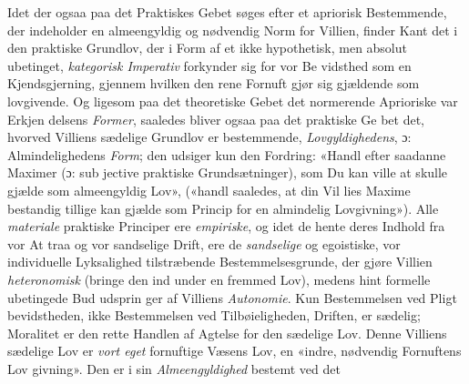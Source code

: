 \documentclass[12pt,a4paper]{book}
\begin{document}
Idet der ogsaa paa det Praktiskes Gebet søges efter et
apriorisk Bestemmende, der indeholder en almeengyldig og
nødvendig Norm for Villien, finder Kant det i den praktiske
Grundlov, der i Form af et ikke hypothetisk, men absolut
ubetinget, \emph{kategorisk Imperativ} forkynder sig for vor Be\-%
vidsthed som en Kjendsgjerning, gjennem hvilken den rene
Fornuft gjør sig gjældende som lovgivende. Og ligesom paa
det theoretiske Gebet det normerende Aprioriske var Erkjen\-%
delsens \emph{Former}, saaledes bliver ogsaa paa det praktiske Ge\-%
bet det, hvorved Villiens sædelige Grundlov er bestemmende,
\emph{Lovgyldighedens}, ɔ: Almindelighedens \emph{Form}; den udsiger
kun den Fordring: «Handl efter saadanne Maximer (ɔ: sub\-%
jective praktiske Grundsætninger), som Du kan ville at skulle
gjælde som almeengyldig Lov», («handl saaledes, at din Vil\-%
lies Maxime bestandig tillige kan gjælde som Princip for en
almindelig Lovgivning»). Alle \emph{materiale} praktiske Principer
ere \emph{empiriske}, og idet de hente deres Indhold fra vor At\-%
traa og vor sandselige Drift, ere de \emph{sandselige} og egoistiske,
vor individuelle Lyksalighed tilstræbende Bestemmelsesgrunde,
der gjøre Villien \emph{heteronomisk} (bringe den ind under en
fremmed Lov), medens hint formelle ubetingede Bud udsprin\-%
ger af Villiens \emph{Autonomie}. Kun Bestemmelsen ved Pligt\-%
bevidstheden, ikke Bestemmelsen ved Tilbøieligheden, Driften,
er sædelig; Moralitet er den rette Handlen af Agtelse for den
sædelige Lov. Denne Villiens sædelige Lov er \emph{vort eget}
fornuftige Væsens Lov, en «indre, nødvendig Fornuftens Lov\-%
givning». Den er i sin \emph{Almeengyldighed} bestemt ved det
\end{document}
